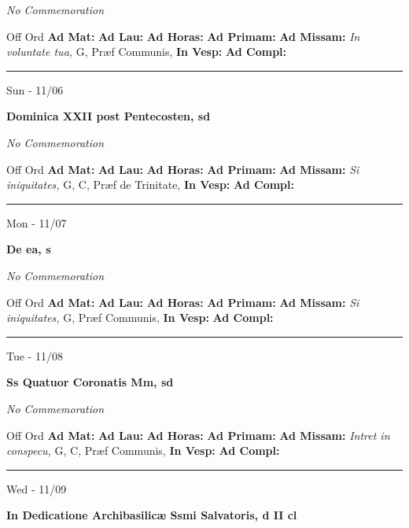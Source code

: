 \documentclass[letterpaper, 10pt]{article}
\begin{document}
\textit{No Commemoration}\begin{justify}
Off Ord
\textbf{Ad Mat: }
\textbf{Ad Lau: }
\textbf{Ad Horas: }
\textbf{Ad Primam: }
\textbf{Ad Missam:} \textit{In voluntate tua, } G, Præf Communis, 
\textbf{In Vesp: }
\textbf{Ad Compl: }\end{justify}



\hrule
\begin{center}
Sun - 11/06
\end{center}\textbf{ \large Dominica XXII post Pentecosten, \textnormal{\normalsize sd}}

\textit{No Commemoration}\begin{justify}
Off Ord
\textbf{Ad Mat: }
\textbf{Ad Lau: }
\textbf{Ad Horas: }
\textbf{Ad Primam: }
\textbf{Ad Missam:} \textit{Si iniquitates, } G, C, Præf de Trinitate, 
\textbf{In Vesp: }
\textbf{Ad Compl: }\end{justify}



\hrule
\begin{center}
Mon - 11/07
\end{center}\textbf{ \large De ea, \textnormal{\normalsize s}}

\textit{No Commemoration}\begin{justify}
Off Ord
\textbf{Ad Mat: }
\textbf{Ad Lau: }
\textbf{Ad Horas: }
\textbf{Ad Primam: }
\textbf{Ad Missam:} \textit{Si iniquitates, } G, Præf Communis, 
\textbf{In Vesp: }
\textbf{Ad Compl: }\end{justify}



\hrule
\begin{center}
Tue - 11/08
\end{center}\textbf{ \large Ss Quatuor Coronatis Mm, \textnormal{\normalsize sd}}

\textit{No Commemoration}\begin{justify}
Off Ord
\textbf{Ad Mat: }
\textbf{Ad Lau: }
\textbf{Ad Horas: }
\textbf{Ad Primam: }
\textbf{Ad Missam:} \textit{Intret in conspecu, } G, C, Præf Communis, 
\textbf{In Vesp: }
\textbf{Ad Compl: }\end{justify}



\hrule
\begin{center}
Wed - 11/09
\end{center}\textbf{ \large In Dedicatione Archibasilicæ Ssmi Salvatoris, \textnormal{\normalsize d II cl}}
\end{document}
